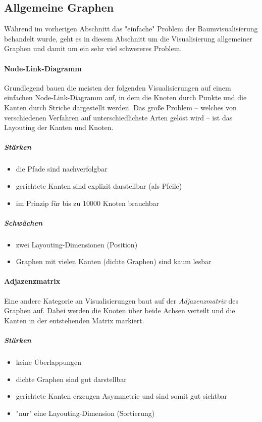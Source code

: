 		\subsection{Allgemeine Graphen}
			Während im vorherigen Abschnitt das "einfache" Problem der Baumvisualisierung behandelt wurde, geht es in diesem Abschnitt um die Visualisierung allgemeiner Graphen und damit um ein sehr viel schwereres Problem.

			\paragraph{Node-Link-Diagramm}
				Grundlegend bauen die meisten der folgenden Visualisierungen auf einem einfachen Node-Link-Diagramm auf, in dem die Knoten durch Punkte und die Kanten durch Striche dargestellt werden. Das große Problem -- welches von verschiedenen Verfahren auf unterschiedlichste Arten gelöst wird -- ist das Layouting der Kanten und Knoten.

				\subparagraph{Stärken}
				\begin{itemize}
					\item die Pfade sind nachverfolgbar
					\item gerichtete Kanten sind explizit darstellbar (\zB als Pfeile)
					\item im Prinzip für bis zu \num{10000} Knoten brauchbar
				\end{itemize}

				\subparagraph{Schwächen}
				\begin{itemize}
					\item zwei Layouting-Dimensionen (Position)
					\item Graphen mit vielen Kanten (dichte Graphen) sind kaum lesbar
				\end{itemize}

			\paragraph{Adjazenzmatrix}
				Eine andere Kategorie an Visualisierungen baut auf der \emph{Adjazenzmatrix} des Graphen auf. Dabei werden die Knoten über beide Achsen verteilt und die Kanten in der entstehenden Matrix markiert.

				\subparagraph{Stärken}
				\begin{itemize}
					\item keine Überlappungen
					\item dichte Graphen sind gut darstellbar
					\item gerichtete Kanten erzeugen Asymmetrie und sind somit gut sichtbar
					\item "nur" eine Layouting-Dimension (Sortierung)
				\end{itemize}

